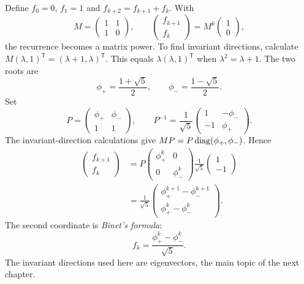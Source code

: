 Define $f_0=0$, $f_1=1$ and $f_{k+2}=f_{k+1}+f_k$.
With
\[
 M=\begin{pmatrix}1&1\\1&0\end{pmatrix},
 \qquad
 \begin{pmatrix}f_{k+1}\\f_k\end{pmatrix}
 =M^k\begin{pmatrix}1\\0\end{pmatrix},
\]
the recurrence becomes a matrix power.
To find invariant directions, calculate
$M(\lambda,1)^{\mathsf T}=(\lambda+1,\lambda)^{\mathsf T}$.
This equals $\lambda(\lambda,1)^{\mathsf T}$ when
$\lambda^2=\lambda+1$.
The two roots are
\[
 \phi_+=\frac{1+\sqrt5}{2},\qquad
 \phi_-=\frac{1-\sqrt5}{2}.
\]
Set
\[
 P=\begin{pmatrix}\phi_+&\phi_-\\1&1\end{pmatrix},\qquad
 P^{-1}=\frac1{\sqrt5}
 \begin{pmatrix}1&-\phi_-\\-1&\phi_+\end{pmatrix}.
\]
The invariant-direction calculations give
$MP=P\operatorname{diag}(\phi_+,\phi_-)$.
Hence
\begin{align*}
 \begin{pmatrix}f_{k+1}\\f_k\end{pmatrix}
 &=P\begin{pmatrix}\phi_+^k&0\\0&\phi_-^k\end{pmatrix}
       \frac1{\sqrt5}\begin{pmatrix}1\\-1\end{pmatrix}\\
 &=\frac1{\sqrt5}
   \begin{pmatrix}\phi_+^{k+1}-\phi_-^{k+1}\\
                   \phi_+^k-\phi_-^k\end{pmatrix}.
\end{align*}
The second coordinate is \emph{Binet's formula}:
\[
 \boxed{f_k=\frac{\phi_+^k-\phi_-^k}{\sqrt5}.}
\]
The invariant directions used here are eigenvectors, the main topic of
the next chapter.
